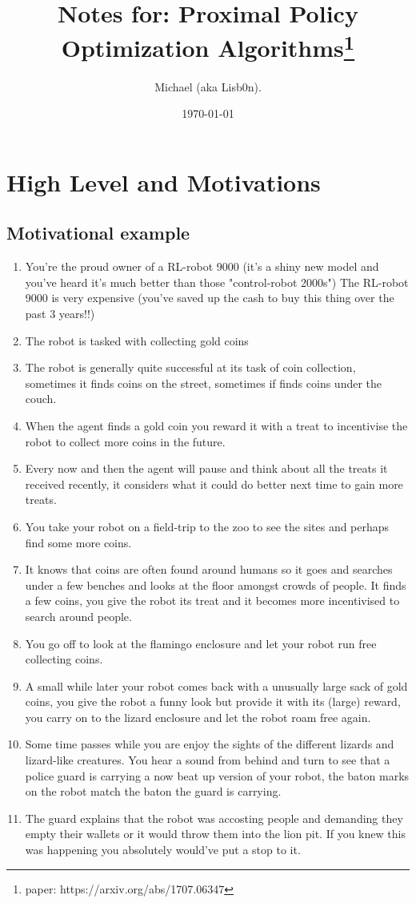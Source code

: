 \documentclass{article}
\title{Notes for: Proximal Policy Optimization Algorithms\thanks{paper: https://arxiv.org/abs/1707.06347}}
\author{Michael (aka Lisb0n).}
\date{\today}
\begin{document}
\maketitle

\section{High Level and Motivations}

\subsection{Motivational example}
\begin{enumerate}
    \item You're the proud owner of a RL-robot 9000 (it's a shiny new model and you've heard it's much better than those "control-robot 2000s") The RL-robot 9000 is very expensive (you've saved up the cash to buy this thing over the past 3 years!!)
    \item The robot is tasked with collecting gold coins
    \item The robot is generally quite successful at its task of coin collection, sometimes it finds coins on the street, sometimes if finds coins under the couch.
    \item When the agent finds a gold coin you reward it with a treat to incentivise the robot to collect more coins in the future.
    \item Every now and then the agent will pause and think about all the treats it received recently, it considers what it could do better next time to gain more treats.
    \item You take your robot on a field-trip to the zoo to see the sites and perhaps find some more coins.
    \item It knows that coins are often found around humans so it goes and searches under a few benches and looks at the floor amongst crowds of people. It finds a few coins, you give the robot its treat and it becomes more incentivised to search around people.
    \item You go off to look at the flamingo enclosure and let your robot run free collecting coins.
    \item A small while later your robot comes back with a unusually large sack of gold coins, you give the robot a funny look but provide it with its (large) reward, you carry on to the lizard enclosure and let the robot roam free again.
    \item Some time passes while you are enjoy the sights of the different lizards and lizard-like creatures. You hear a sound from behind and turn to see that a police guard is carrying a now beat up version of your robot, the baton marks on the robot match the baton the guard is carrying. 
    \item The guard explains that the robot was accosting people and demanding they empty their wallets or it would throw them into the lion pit. If you knew this was happening you absolutely would've put a stop to it.
    

\end{enumerate}
\end{document}
